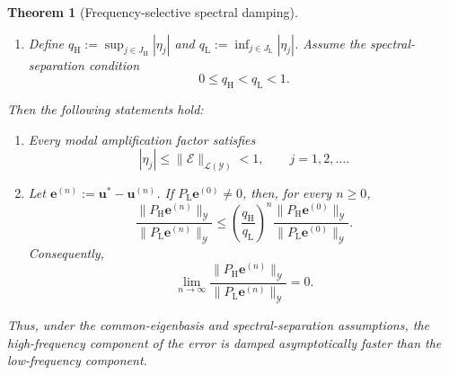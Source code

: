 \documentclass[preprint,numbers,sort&compress]{elsarticle}
\newtheorem{theorem}{Theorem}
\begin{document}
\begin{theorem}[Frequency-selective spectral damping]
\begin{enumerate}
					\item[(v)]
					Define $q_{\mathrm H}
					:=
					\sup_{j\in J_{\mathrm H}}|\eta_j|$ and $q_{\mathrm L}
					:=
					\inf_{j\in J_{\mathrm L}}|\eta_j|$. Assume the spectral-separation condition
					\[
					0\leq q_{\mathrm H}<q_{\mathrm L}<1.
					\]
				\end{enumerate}
				Then the following statements hold:
				
				\begin{enumerate}
					\item[(a)]
					Every modal amplification factor satisfies
					\[
					|\eta_j|
					\leq
					\|\mathcal E\|_{\mathcal L(\mathcal Y)}
					<1,
					\qquad j=1,2,\ldots.
					\]
					
					\item[(b)]
					Let $\boldsymbol e^{(n)}:=\boldsymbol u^* - \boldsymbol u^{(n)}$. 
					If $P_{\mathrm L}\boldsymbol e^{(0)}\neq0$, then, for every $n\geq0$,
					\[
					\frac{
						\|P_{\mathrm H}\boldsymbol e^{(n)}\|_{\mathcal Y}
					}{
						\|P_{\mathrm L}\boldsymbol e^{(n)}\|_{\mathcal Y}
					}
					\leq
					\left(
					\frac{q_{\mathrm H}}{q_{\mathrm L}}
					\right)^n
					\frac{
						\|P_{\mathrm H}\boldsymbol e^{(0)}\|_{\mathcal Y}
					}{
						\|P_{\mathrm L}\boldsymbol e^{(0)}\|_{\mathcal Y}
					}.
					\]
					Consequently,
					\[
					\lim_{n\to\infty}
					\frac{
						\|P_{\mathrm H}\boldsymbol e^{(n)}\|_{\mathcal Y}
					}{
						\|P_{\mathrm L}\boldsymbol e^{(n)}\|_{\mathcal Y}
					}
					=0.
					\]
				\end{enumerate}
				Thus, under the common-eigenbasis and spectral-separation assumptions, the high-frequency component of the error is damped asymptotically faster than the low-frequency component.
			\end{theorem}
			\endgroup
			
\end{document}
